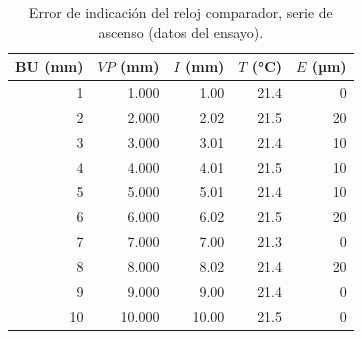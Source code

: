 \begin{table}[H]
\centering
\caption{Error de indicación del reloj comparador, serie de ascenso (datos del ensayo).}
\label{tab:reloj-ascenso}
\begin{tabular}{rrrrr}
\toprule
BU (mm) & $VP$ (mm) & $I$ (mm) & $T$ (°C) & $E$ (µm) \\
\midrule
1 & 1.000 & 1.00 & 21.4 & 0 \\
2 & 2.000 & 2.02 & 21.5 & 20 \\
3 & 3.000 & 3.01 & 21.4 & 10 \\
4 & 4.000 & 4.01 & 21.5 & 10 \\
5 & 5.000 & 5.01 & 21.4 & 10 \\
6 & 6.000 & 6.02 & 21.5 & 20 \\
7 & 7.000 & 7.00 & 21.3 & 0 \\
8 & 8.000 & 8.02 & 21.4 & 20 \\
9 & 9.000 & 9.00 & 21.4 & 0 \\
10 & 10.000 & 10.00 & 21.5 & 0 \\
\bottomrule
\end{tabular}
\end{table}
